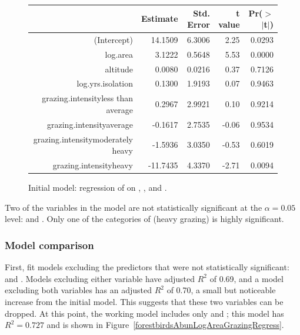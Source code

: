 \begin{figure}[ht]
\centering
\begin{tabular}{rrrrr}
  \hline
 & Estimate & Std. Error & t value & Pr($>$$|$t$|$) \\ 
  \hline
(Intercept) & 14.1509 & 6.3006 & 2.25 & 0.0293 \\ 
  log.area & 3.1222 & 0.5648 & 5.53 & 0.0000 \\ 
  altitude & 0.0080 & 0.0216 & 0.37 & 0.7126 \\ 
  log.yrs.isolation & 0.1300 & 1.9193 & 0.07 & 0.9463 \\ 
  grazing.intensityless than average & 0.2967 & 2.9921 & 0.10 & 0.9214 \\ 
  grazing.intensityaverage & -0.1617 & 2.7535 & -0.06 & 0.9534 \\ 
  grazing.intensitymoderately heavy & -1.5936 & 3.0350 & -0.53 & 0.6019 \\ 
  grazing.intensityheavy & -11.7435 & 4.3370 & -2.71 & 0.0094 \\ 
   \hline
\end{tabular}
\caption{Initial model: regression of  on , ,  and .}
\label{forestbirdsAbunLogAreaAltLogIsolGrazingIntensityRegress}
\end{figure}

Two of the variables in the model are not statistically significant at the $\alpha = 0.05$ level:  and . Only one of the categories of  (heavy grazing) is highly significant.


\textD{\newpage}


\subsubsection{Model comparison}

First, fit models excluding the predictors that were not statistically significant:  and . Models excluding either variable have adjusted $R^2$ of 0.69, and a model excluding both variables has an adjusted $R^2$ of 0.70, a small but noticeable increase from the initial model. This suggests that these two variables can be dropped. At this point, the working model includes only  and ; this model has $R^2 = 0.727$ and is shown in Figure~\ref{forestbirdsAbunLogAreaGrazingRegress}. 

